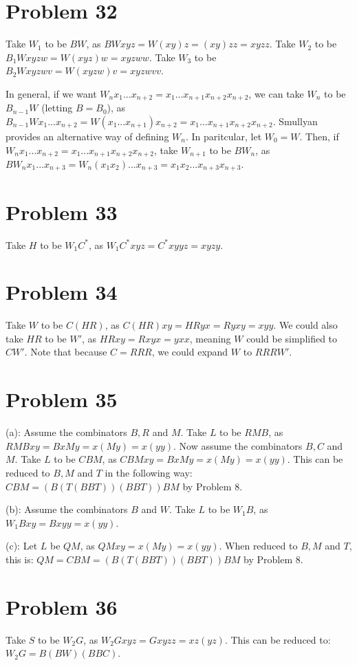 \documentclass{article}
\theoremstyle{definition}
\begin{document}
\section*{Problem 32}
Take $W_1$ to be $BW$, as $BWxyz=W(xy)z=(xy)zz=xyzz$. Take $W_2$ to be $B_1Wxyzw=W(xyz)w=xyzww$. Take $W_3$ to be $B_2Wxyzwv=W(xyzw)v=xyzwvv$.


In general, if we want $W_nx_1...x_{n+2}=x_1...x_{n+1}x_{n+2}x_{n+2}$, 
we can take $W_n$ to be $B_{n-1}W$ (letting $B=B_0$), as $B_{n-1}Wx_1...x_{n+2}=W(x_1...x_{n+1})x_{n+2}=x_1...x_{n+1}x_{n+2}x_{n+2}$. Smullyan provides an alternative way of 
defining $W_n$. In paritcular, let $W_0=W$. Then, if $W_nx_1...x_{n+2}=x_1...x_{n+1}x_{n+2}x_{n+2}$, take $W_{n+1}$ to be $BW_n$, as 
$BW_nx_1...x_{n+3}=W_n(x_1x_2)...x_{n+3}=x_1x_2...x_{n+3}x_{n+3}$.

\section*{Problem 33}
Take $H$ to be $W_1C^*$, as $W_1C^*xyz=C^*xyyz=xyzy$.

\section*{Problem 34}
Take $W$ to be $C(HR)$, as $C(HR)xy=HRyx=Ryxy=xyy$. We could also take $HR$ to be $W'$, as $HRxy=Rxyx=yxx$, meaning $W$ could be simplified to 
$CW'$. Note that because $C=RRR$, we could expand $W$ to $RRRW'$.

\section*{Problem 35}
(a): Assume the combinators $B,R$ and $M$. Take $L$ to be $RMB$, as $RMBxy=BxMy=x(My)=x(yy)$. Now assume the combinators $B,C$ and $M$. Take $L$ to be 
$CBM$, as $CBMxy=BxMy=x(My)=x(yy)$. This can be reduced to $B,M$ and $T$ in the following way: $CBM=(B(T(BBT))(BBT))BM$ by Problem 8.


(b): Assume the combinators $B$ and $W$. Take $L$ to be $W_1B$, as $W_1Bxy=Bxyy=x(yy)$.


(c): Let $L$ be $QM$, as $QMxy=x(My)=x(yy)$. When reduced to $B,M$ and $T$, this is: $QM=CBM=(B(T(BBT))(BBT))BM$ by Problem 8.

\section*{Problem 36}
Take $S$ to be $W_2G$, as $W_2Gxyz=Gxyzz=xz(yz)$. This can be reduced to: $W_2G=B(BW)(BBC)$.
\end{document}
